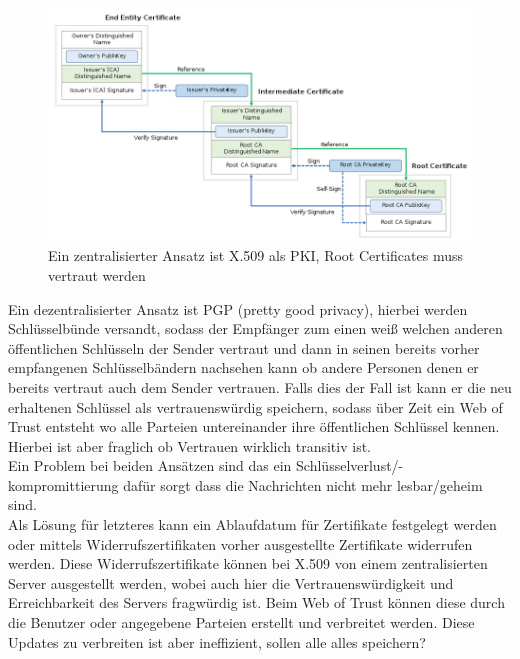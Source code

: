 \documentclass[a4paper,12pt,leqno]{article}
\begin{document}
\begin{figure}
\label{pic:Chainoftrust}
\centering
\includegraphics[scale=0.5]{Grafiken/Chain-Of-Trust.png}
\caption{Ein zentralisierter Ansatz ist X.509 als PKI, Root Certificates muss vertraut werden}
\end{figure}

Ein dezentralisierter Ansatz ist PGP (pretty good privacy), hierbei werden Schlüsselbünde versandt, sodass der Empfänger zum einen weiß welchen anderen öffentlichen Schlüsseln der Sender vertraut und dann in seinen bereits vorher empfangenen Schlüsselbändern nachsehen kann ob andere Personen denen er bereits vertraut auch dem Sender vertrauen. Falls dies der Fall ist kann er die neu erhaltenen Schlüssel als vertrauenswürdig speichern, sodass über Zeit ein Web of Trust entsteht wo alle Parteien untereinander ihre öffentlichen Schlüssel kennen. Hierbei ist aber fraglich ob Vertrauen wirklich transitiv ist.\\

Ein Problem bei beiden Ansätzen sind das ein Schlüsselverlust/-kompromittierung dafür sorgt dass die Nachrichten nicht mehr lesbar/geheim sind.\\
Als Lösung für letzteres kann ein Ablaufdatum für Zertifikate festgelegt werden oder mittels Widerrufszertifikaten vorher ausgestellte Zertifikate widerrufen werden.
Diese Widerrufszertifikate können bei X.509 von einem zentralisierten Server ausgestellt werden, wobei auch hier die Vertrauenswürdigkeit und Erreichbarkeit des Servers fragwürdig ist.
Beim Web of Trust können diese durch die Benutzer oder angegebene Parteien erstellt und verbreitet werden. Diese Updates zu verbreiten ist aber ineffizient, sollen alle alles speichern?
\end{document}
